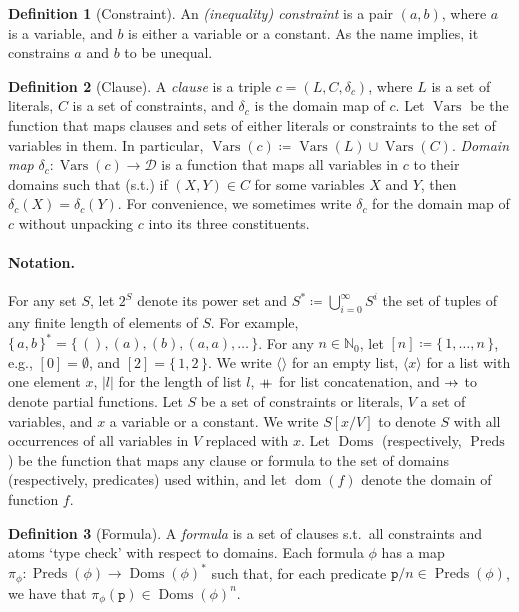 \documentclass{article}
\theoremstyle{definition}
\newtheorem{definition}{Definition}
\theoremstyle{remark}
\newcommand\pfun{\mathrel{\ooalign{\hfil$\mapstochar\mkern5mu$\hfil\cr$\to$\cr}}}
\newcommand\mdoubleplus{\mathbin{+\mkern-10mu+}}
\DeclareMathOperator{\dom}{dom}
\DeclareMathOperator{\Doms}{Doms}
\DeclareMathOperator{\Vars}{Vars}
\DeclareMathOperator{\Preds}{Preds}
\begin{document}
\begin{definition}[Constraint]\label{def:constraint}
  An \emph{(inequality) constraint} is a pair $(a, b)$, where $a$ is a variable,
  and $b$ is either a variable or a constant. As the name implies, it constrains
  $a$ and $b$ to be unequal.
\end{definition}

\begin{definition}[Clause]\label{def:clause}
  A \emph{clause}
  is a triple $c = (L, C, \delta_c)$, where $L$ is a set of literals, $C$ is a
  set of constraints, and $\delta_c$ is the domain map of $c$. Let $\Vars$ be
  the function that maps clauses and sets of either literals or constraints to
  the set of variables in them. In particular,
  $\Vars(c) \coloneqq \Vars(L) \cup \Vars(C)$. \emph{Domain map}
  $\delta_{c}\colon \Vars(c) \to \mathcal{D}$ is a function that maps all
  variables in $c$ to their domains such that (s.t.) if $(X, Y) \in C$ for some
  variables $X$ and $Y$, then $\delta_c(X) = \delta_c(Y)$. For convenience, we
  sometimes write $\delta_c$ for the domain map of $c$ without unpacking $c$
  into its three constituents.
\end{definition}

\paragraph{Notation.}
For any set $S$, let $2^{S}$ denote its power set and
$S^{\ast} \coloneqq \bigcup_{i=0}^{\infty} S^{i}$ the set of tuples of any
finite length of elements of $S$. For example,
$\{\,a, b\,\}^{\ast} = \{\, (), (a), (b), (a, a), \dots \,\}$. For any
$n \in \mathbb{N}_{0}$, let $[n] \coloneqq \{\, 1, \dots, n \,\}$, e.g.,
$[0] = \emptyset$, and $[2] = \{\, 1, 2 \,\}$. We write $\langle\rangle$ for an
empty list, $\langle x \rangle$ for a list with one element $x$, $|l|$ for the
length of list $l$, $\mdoubleplus$ for list concatenation, and $\pfun$ to denote
partial functions. Let $S$ be a set of constraints or literals, $V$ a set of
variables, and $x$ a variable or a constant. We write $S[x/V]$ to denote $S$
with all occurrences of all variables in $V$ replaced with $x$. Let $\Doms$
(respectively, $\Preds$) be the function that maps any clause or formula to the
set of domains (respectively, predicates) used within, and let $\dom(f)$ denote
the domain of function $f$.

\begin{definition}[Formula]\label{def:formula}
  A \emph{formula} is a set of clauses s.t.\ all constraints and atoms `type
  check' with respect to domains. Each formula $\phi$ has a map
  $\pi_{\phi}\colon \Preds(\phi) \to {\Doms(\phi)}^{\ast}$ such that, for each
  predicate $\texttt{p}/n \in \Preds(\phi)$, we have that
  $\pi_{\phi}(\texttt{p}) \in {\Doms(\phi)}^{n}$.
\end{definition}
\end{document}
